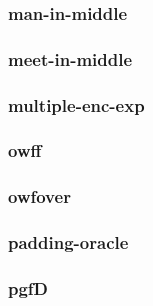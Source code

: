 \begin{frame}\frametitle{man-in-middle}
\begin{figure}
\begin{center}

\end{center}
\end{figure}
\end{frame}
\begin{frame}\frametitle{meet-in-middle}
\begin{figure}
\begin{center}

\end{center}
\end{figure}
\end{frame}
\begin{frame}\frametitle{multiple-enc-exp}
\begin{figure}
\begin{center}

\end{center}
\end{figure}
\end{frame}
\begin{frame}\frametitle{owff}
\begin{figure}
\begin{center}

\end{center}
\end{figure}
\end{frame}
\begin{frame}\frametitle{owfover}
\begin{figure}
\begin{center}

\end{center}
\end{figure}
\end{frame}
\begin{frame}\frametitle{padding-oracle}
\begin{figure}
\begin{center}

\end{center}
\end{figure}
\end{frame}
\begin{frame}\frametitle{pgfD}
\begin{figure}
\begin{center}

\end{center}
\end{figure}
\end{frame}
